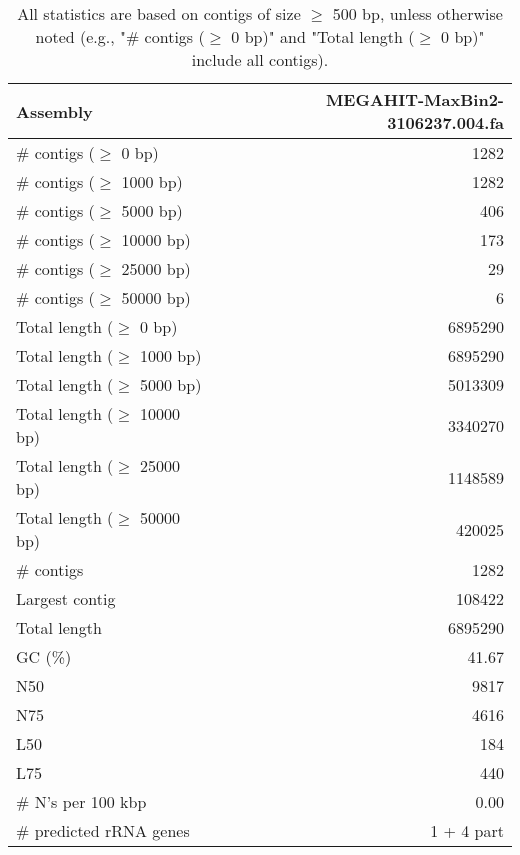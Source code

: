 \documentclass[12pt,a4paper]{article}
\begin{document}
\begin{table}[ht]
\begin{center}
\caption{All statistics are based on contigs of size $\geq$ 500 bp, unless otherwise noted (e.g., "\# contigs ($\geq$ 0 bp)" and "Total length ($\geq$ 0 bp)" include all contigs).}
\begin{tabular}{|l*{1}{|r}|}
\hline
Assembly & MEGAHIT-MaxBin2-3106237.004.fa \\ \hline
\# contigs ($\geq$ 0 bp) & 1282 \\ \hline
\# contigs ($\geq$ 1000 bp) & 1282 \\ \hline
\# contigs ($\geq$ 5000 bp) & 406 \\ \hline
\# contigs ($\geq$ 10000 bp) & 173 \\ \hline
\# contigs ($\geq$ 25000 bp) & 29 \\ \hline
\# contigs ($\geq$ 50000 bp) & 6 \\ \hline
Total length ($\geq$ 0 bp) & 6895290 \\ \hline
Total length ($\geq$ 1000 bp) & 6895290 \\ \hline
Total length ($\geq$ 5000 bp) & 5013309 \\ \hline
Total length ($\geq$ 10000 bp) & 3340270 \\ \hline
Total length ($\geq$ 25000 bp) & 1148589 \\ \hline
Total length ($\geq$ 50000 bp) & 420025 \\ \hline
\# contigs & 1282 \\ \hline
Largest contig & 108422 \\ \hline
Total length & 6895290 \\ \hline
GC (\%) & 41.67 \\ \hline
N50 & 9817 \\ \hline
N75 & 4616 \\ \hline
L50 & 184 \\ \hline
L75 & 440 \\ \hline
\# N's per 100 kbp & 0.00 \\ \hline
\# predicted rRNA genes & 1 + 4 part \\ \hline
\end{tabular}
\end{center}
\end{table}
\end{document}

